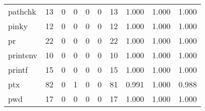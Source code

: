 \begin{longtable}{lp{2.0cm}p{2.0cm}p{2.0cm}p{2.0cm}p{2.0cm}p{2.0cm}p{2.0cm}p{2.0cm}p{2.0cm}}
pathchk   &                     13 &                                             0 &                                            0 &                                           0 &                                            0 &                                         13 &                                1.000 &                                  1.000 &                                1.000 \\
pinky     &                     12 &                                             0 &                                            0 &                                           0 &                                            0 &                                         12 &                                1.000 &                                  1.000 &                                1.000 \\
pr        &                     22 &                                             0 &                                            0 &                                           0 &                                            0 &                                         22 &                                1.000 &                                  1.000 &                                1.000 \\
printenv  &                     10 &                                             0 &                                            0 &                                           0 &                                            0 &                                         10 &                                1.000 &                                  1.000 &                                1.000 \\
printf    &                     15 &                                             0 &                                            0 &                                           0 &                                            0 &                                         15 &                                1.000 &                                  1.000 &                                1.000 \\
ptx       &                     82 &                                             0 &                                            1 &                                           0 &                                            0 &                                         81 &                                0.991 &                                  1.000 &                                0.988 \\
pwd       &                     17 &                                             0 &                                            0 &                                           0 &                                            0 &                                         17 &                                1.000 &                                  1.000 &                                1.000 \\

\end{longtable}
